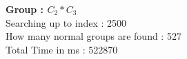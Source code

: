 \textbf{Group : $C_2*C_3$}\\
Searching up to index : 2500\\
How many normal groups are found : 527\\
Total Time in ms : 522870\\
